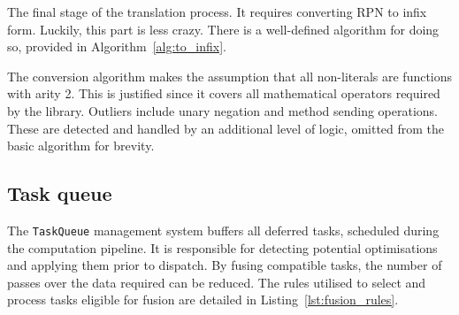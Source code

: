 The final stage of the translation process. It requires converting \ac{RPN} to infix form.
Luckily, this part is less crazy. There is a well-defined algorithm for doing so, provided in Algorithm~\ref{alg:to_infix}.

The conversion algorithm makes the assumption that all non-literals are functions with arity 2. This is justified since it covers all mathematical operators required by the library. Outliers include unary negation and method sending operations. These are detected and handled by an additional level of logic, omitted from the basic algorithm for brevity.

\subsection{Task queue}
The \verb|TaskQueue| management system buffers all deferred tasks, scheduled during the computation pipeline. It is responsible for detecting potential optimisations and applying them prior to dispatch.
By fusing compatible tasks, the number of passes over the data required can be reduced. The rules utilised to select and process tasks eligible for fusion are detailed in Listing~\ref{lst:fusion_rules}.

